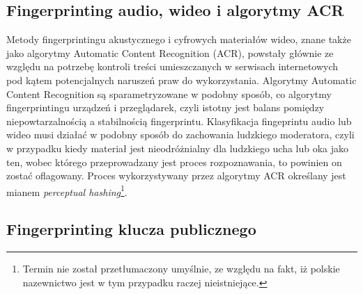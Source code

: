 \subsection{Fingerprinting audio, wideo i algorytmy ACR}
Metody fingerprintingu akustycznego i cyfrowych materiałów wideo, znane także
jako algorytmy Automatic Content Recognition (ACR), powstały głównie ze względu
na potrzebę kontroli treści umieszczanych w serwisach internetowych pod kątem
potencjalnych naruszeń praw do wykorzystania. Algorytmy Automatic Content
Recognition są sparametryzowane w podobny sposób, co algorytmy fingerprintingu
urządzeń i przeglądarek, czyli istotny jest balans pomiędzy niepowtarzalnością a
stabilnością fingerprintu. Klasyfikacja fingeprintu audio lub wideo musi działać
w podobny sposób do zachowania ludzkiego moderatora, czyli w przypadku kiedy
materiał jest nieodróżnialny dla ludzkiego ucha lub oka jako ten, wobec którego
przeprowadzany jest proces rozpoznawania, to powinien on zostać oflagowany.
Proces wykorzystywany przez algorytmy ACR określany jest mianem \emph{perceptual
	hashing}\footnote{Termin nie został	przetłumaczony umyślnie, ze względu na
fakt, iż polskie nazewnictwo jest w tym przypadku raczej nieistniejące.}.

\subsection{Fingerprinting klucza publicznego}
